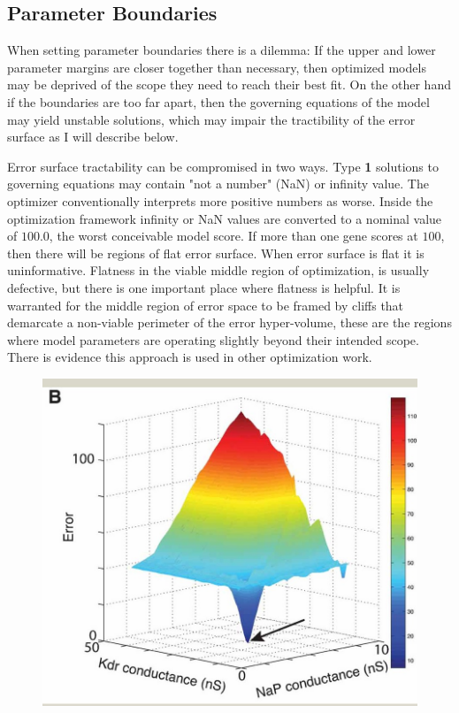    

\subsection{Parameter Boundaries}
When setting parameter boundaries there is a dilemma: If the upper and lower parameter margins are closer together than necessary, then optimized models may be deprived of the scope they need to reach their best fit. On the other hand if the boundaries are too far apart, then the governing equations of the model may yield unstable solutions, which may impair the tractibility of the error surface as I will describe below.

Error surface tractability can be compromised in two ways.
Type \textbf{1} solutions to governing equations may contain "not a number" (NaN) or infinity value. The optimizer conventionally interprets more positive numbers as worse. Inside the optimization framework infinity or NaN values are converted to a nominal value of $100.0$, the worst conceivable model score. If more than one gene scores at $100$, then there will be regions of flat error surface. %
When error surface is flat it is uninformative. Flatness in the viable middle region of optimization, is usually defective, but there is one important place where flatness is helpful. It is warranted for the middle region of error space to be framed by cliffs that demarcate a non-viable perimeter of the error hyper-volume, these are the regions where model parameters are operating slightly beyond their intended scope. There is evidence this approach is used in other optimization work.


\begin{figure}
    \centering
    \includegraphics[scale=0.65]{figures/fninf-01-001-g009.jpg}
    \caption{\cite{}}
    \label{fig:best_at_edge}
\end{figure}

